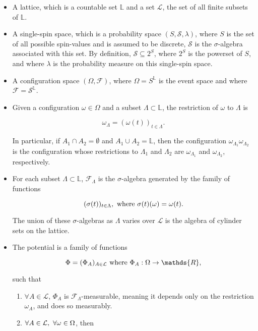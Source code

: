 \documentclass{homework}
\begin{document}
\begin{itemize}
    \item A lattice, which is a countable set $\mathds{L}$ and a set $\mathcal{L}$, the set of all finite subsets of $\mathds{L}$.
    \item A single-spin space, which is a probability space $(S, \bm{\mathcal{S}}, \lambda)$, where $S$ is the set of all possible spin-values and is assumed to be discrete, $\bm{\mathcal{S}}$ is the $\sigma$-algebra associated with this set. By definition, $\bm{\mathcal{S}} \subseteq 2^{S}$, where $2^{S}$ is the powerset of $S$, and where $\lambda$ is the probability measure on this single-spin space.
    \item A configuration space $(\Omega, \mathcal{F})$, where $\Omega = S^{\mathds{L}}$ is the event space and where $\mathcal{F} = \mathcal{S}^{\mathds{L}}$.
    \item Given a configuration $\omega \in \Omega$ and a subset $\Lambda \subset \mathds{L}$, the restriction of $\omega$ to $\Lambda$ is 
    
    $$
        \omega_{\Lambda} = (\omega(t))_{t \in \Lambda}.
    $$
    
    In particular, if $A_1 \cap A_2 = \emptyset$ and $A_1 \cup A_2 = \mathds{L}$, then the configuration $\omega_{\Lambda_1} \omega_{\Lambda_2}$ is the configuration whose restrictions to $\Lambda_1$ and $\Lambda_2$ are $\omega_{\Lambda_1}$ and $\omega_{\Lambda_2}$, respectively. \\
    \item For each subset $\Lambda \subset \mathds{L}$, $\mathcal{F}_{\Lambda}$ is the $\sigma$-algebra generated by the family of functions 
    
    $$
        (\sigma(t))_{t\in \Lambda}, \textnormal{   where   } \sigma(t) (\omega) = \omega(t). 
    $$
    
    The union of these $\sigma$-algebras as $\Lambda$ varies over $\mathcal{L}$ is the algebra of cylinder sets on the lattice. 
    \item The potential is a family of functions 
    
    \begin{equation*}
        \Phi = (\Phi_A)_{A \in \mathcal{L}} \textnormal{   where   } \Phi_A : \Omega \rightarrow \mathds{R},
    \end{equation*}
    
    such that 
    
    \begin{enumerate}
        \item $\forall A \in \mathcal{L}$, $\Phi_A$ is $\mathcal{F}_\Lambda$-measurable, meaning it depends only on the restriction $\omega_A$, and does so measurably. 
        \item $\forall A \in \mathcal{L}, \textnormal{ } \forall \omega \in \Omega$, then 
        

\end{enumerate}
\end{itemize}
\end{document}
